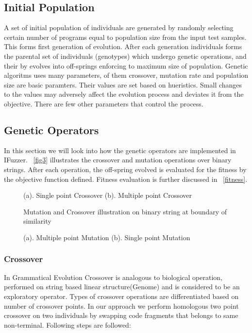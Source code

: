 \documentclass{acm_proc_article-sp}
\begin{document}
\subsection{Initial Population}
A set of initial population of individuals are generated by randomly selecting certain number of programs equal to population size from the input test samples. This forms first generation of evolution. After each generation individuals forms the parental set of individuals (genotypes) which undergo genetic operations, and their by evolves into off-springs enforcing to maximum size of population.
Genetic algoritms uses many parameters, of them crossover, mutation rate and population size are basic paramters. Their values are set based on hueristics. Small changes to the values may adversely affect the evolution process and deviates it from the objective. There are few other parameters that control the process. 

\subsection{Genetic Operators}
In this section we will look into how the genetic operators are implemented in IFuzzer. ~\autoref{fig3} illustrates the crossover and mutation operations over binary strings. After each operation, the off-spring evolved is evaluated for the fitness by the objective function defined. Fitness evaluation is further discussed in ~\autoref{fitness}.

\begin{figure*}
\centering
{}
\caption {(a). Single point Crossover (b). Multiple point Crossover }
\label{fig2}
\end{figure*}

\begin{figure*}
\centering
{}
\caption {(a). Multiple point Mutation (b). Single point Mutation }
\medskip
Mutation and Crossover illustration on binary string at boundary of similarity
\label{fig3}
\end{figure*}

\subsubsection{Crossover}
In Grammatical Evolution Crossover \cite{Ryan03} is analogous to biological operation, performed on string based linear structure(Genome) and is considered to be an exploratory operator. Types of crossover operations are differentiated based on number of crossover points. In our approach we perform  homologous two point crossover on two individuals by swapping code fragments that belongs to same non-terminal. Following steps are followed:
\end{document}
